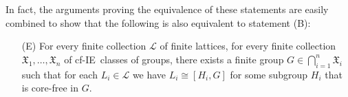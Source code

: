 \documentclass[11pt]{amsart}
\theoremstyle{plain}
\theoremstyle{definition}
\theoremstyle{remark}
\numberwithin{theorem}{section}
\numberwithin{claim}{section}
\numberwithin{equation}{section}
\numberwithin{conjecture}{section}
\newcommand{\<}{\ensuremath{\langle}}
\renewcommand{\>}{\ensuremath{\rangle}}
\renewcommand{\leq}{\ensuremath{\leqslant}}
\newcommand{\FLRP}{{\small FLRP}}
\newcommand{\0}{\ensuremath{\mathbf{0}}}
\newcommand{\1}{\ensuremath{\mathbf{1}}}
\newcommand{\2}{\ensuremath{\mathbf{2}}}
\newcommand{\3}{\ensuremath{\mathbf{3}}}
\newcommand{\4}{\ensuremath{\mathbf{4}}}
\newcommand{\5}{\ensuremath{\mathbf{5}}}
\newcommand{\sG}{\ensuremath{\mathfrak{X}}}
\newcommand{\sL}{\ensuremath{\mathscr{L}}}
\newcommand{\cP}{\ensuremath{\mathcal{P}}}
\newcommand{\IE}{{\small IE}}
\begin{document}
In fact, the arguments proving the equivalence of these
statements are easily combined to show that the following is also equivalent to
statement (B):
{\it 
\begin{enumerate}
\item[(E)]
For every finite collection $\sL$ of finite lattices, for every finite collection $\sG_1, \dots, \sG_n$
of cf-\IE\ classes of groups,
there exists a finite group $G \in \bigcap\limits_{i=1}^n \sG_i$ such that for
each $L_i \in \sL$ we have $L_i\cong [H_i, G]$ for some subgroup
$H_i$ that is core-free in $G$. %
\end{enumerate}
}



\end{document}
